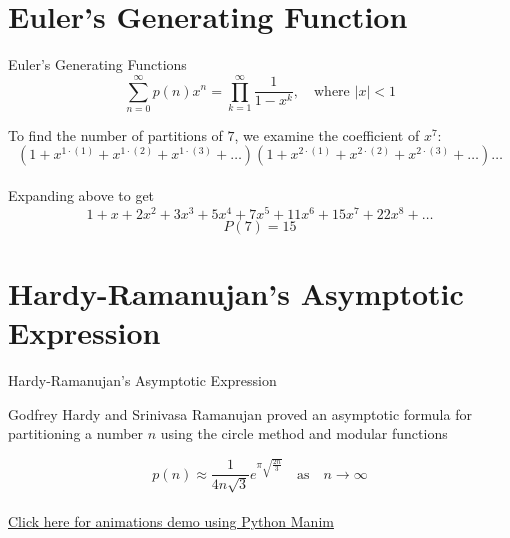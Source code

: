 \documentclass{beamer}
\begin{document}
    \section{Euler’s Generating Function}
    \begin{frame}{Euler’s Generating Functions}
        \begin{equation}
            \sum_{n=0}^{\infty} p(n) x^n = \prod_{k=1}^{\infty} \frac{1}{1-x^k}, \quad \text{where } |x| < 1
        \end{equation}

        \begin{example}
            To find the number of partitions of $7$, we examine the coefficient of $x^7$:
            \begin{equation}
                (1 + x^{1\cdot(1)} + x^{1\cdot(2)} + x^{1\cdot(3)} + \ldots )(1 + x^{2\cdot(1)} + x^{2\cdot(2)} + x^{2\cdot(3)} + \ldots ) \ldots
            \end{equation} \\
            Expanding above to get
            \begin{equation}
                1 + x + 2x^2 + 3x^3 + 5x^4 + 7x^5 + 11x^6 + 15x^7 + 22x^8 + \ldots
            \end{equation}
            \begin{equation}
                P(7) = 15
            \end{equation}
        \end{example}
    \end{frame}
    \section{Hardy-Ramanujan’s Asymptotic Expression}
    \begin{frame}{Hardy-Ramanujan’s Asymptotic Expression}
        \begin{definition}
            Godfrey Hardy and Srinivasa Ramanujan proved an asymptotic formula for partitioning a number \(n\) using the circle method and modular functions
        \end{definition}
        \begin{equation}
            p(n) \approx \frac{1}{4n\sqrt{3}} e^{\pi \sqrt{\frac{2n}{3}}} \quad \text{as} \quad n \to \infty
        \end{equation} \\
        \centering \href{https://youtu.be/UYjqhT5xnsY}{Click here for animations demo using Python Manim}\
    \end{frame}
\end{document}
